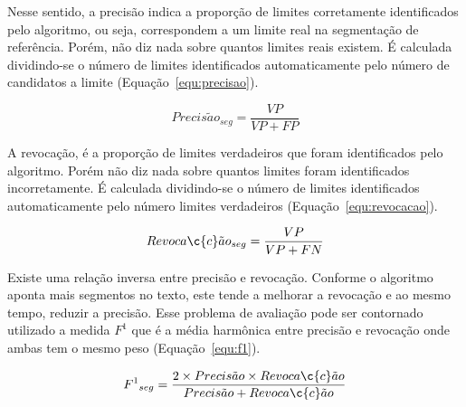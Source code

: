 Nesse sentido, a precisão indica a proporção de limites corretamente identificados pelo algoritmo, ou seja, correspondem a um limite real na segmentação de referência. 
Porém, não diz nada sobre quantos limites reais existem. 
É calculada dividindo-se o número de limites identificados automaticamente pelo número de candidatos a limite (Equação~\ref{equ:precisao}).
 
 \begin{equation}
	 Precis\tilde{a}o_{seg} = \frac{VP}{VP+FP}
	 \label{equ:precisao}
 \end{equation}



 A revocação, é a proporção de limites verdadeiros que foram identificados pelo algoritmo. Porém não diz nada sobre quantos limites foram identificados incorretamente. É calculada dividindo-se o número de limites identificados automaticamente pelo número limites verdadeiros (Equação~\ref{equ:revocacao}).
 
 \begin{equation}
	 Revoca\c{c}\tilde{a}o_{seg} = \frac{VP}{VP+FN}
	 \label{equ:revocacao}
 \end{equation}

 Existe uma relação inversa entre precisão e revocação. Conforme o algoritmo aponta mais segmentos no texto, este tende a melhorar a revocação e ao mesmo tempo, reduzir a precisão. Esse problema de avaliação pode ser contornado utilizado a medida $F^1$ que é a média harmônica entre precisão e revocação onde ambas tem o mesmo peso (Equação~\ref{equ:f1}). 

 \begin{equation}
	 {F^1}_{seg} = \frac{2 \times Precis\tilde{a}o \times Revoca\c{c}\tilde{a}o}
		        {Precis\tilde{a}o + Revoca\c{c}\tilde{a}o}
	 \label{equ:f1}
 \end{equation}






